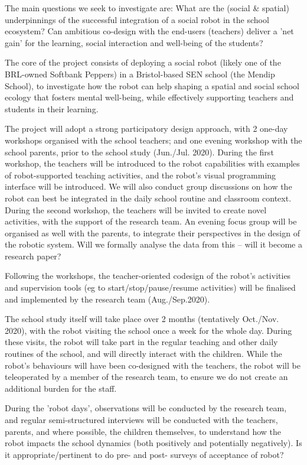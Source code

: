 \documentclass[11pt,a4paper]{report}
\begin{document}
The main questions we seek to investigate are: What are the (social \& spatial)
underpinnings of the successful integration of a social robot in the school
ecosystem? Can ambitious co-design with the end-users (teachers) deliver a 'net
gain' for the learning, social interaction and well-being of the students? 


The core of the project consists of deploying a social robot (likely one of the
BRL-owned Softbank Peppers) in a Bristol-based SEN school (the Mendip School),
to investigate how the robot can help shaping a spatial and social school
ecology that fosters mental well-being, while effectively supporting teachers
and students in their learning. 

The project will adopt a strong participatory design approach, with 2 one-day
workshops organised with the school teachers; and one evening workshop with the
school parents, prior to the school study (Jun./Jul. 2020). During the first
workshop, the teachers will be introduced to the robot capabilities with
examples of robot-supported teaching activities, and the robot's visual
programming interface will be introduced. We will also conduct group discussions
on how the robot can best be integrated in the daily school routine and
classroom context. During the second workshop, the teachers will be invited to
create novel activities, with the support of the research team. An evening focus
group will be organised as well with the parents, to integrate their
perspectives in the design of the robotic system.  Will we formally analyse the
data from this – will it become a research paper? 

Following the workshops, the teacher-oriented codesign of the robot's activities
and supervision tools (eg to start/stop/pause/resume activities) will be
finalised and implemented by the research team (Aug./Sep.2020). 

The school study itself will take place over 2 months (tentatively Oct./Nov.
2020), with the robot visiting the school once a week for the whole day. During
these visits, the robot will take part in the regular teaching and other daily
routines of the school, and will directly interact with the children. While the
robot's behaviours will have been co-designed with the teachers, the robot will
be teleoperated by a member of the research team, to ensure we do not create an
additional burden for the staff. 

During the 'robot days', observations will be conducted by the research team,
and regular semi-structured interviews will be conducted with the teachers,
parents, and where possible, the children themselves, to understand how the
robot impacts the school dynamics  (both positively and potentially negatively).
Is it appropriate/pertinent to do pre- and post- surveys of acceptance of robot? 
\end{document}
